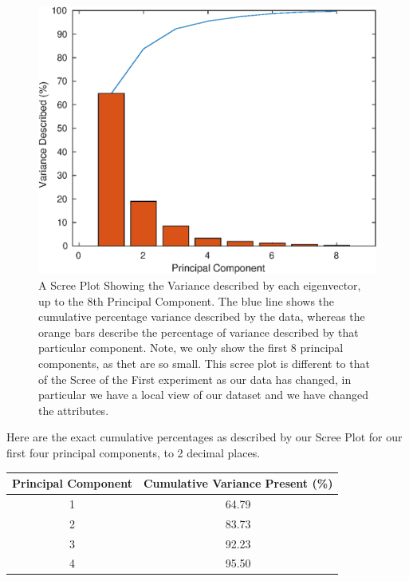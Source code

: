 \documentclass{article}
\begin{document}
\begin{figure}[H]
\centering
\caption{A Scree Plot Showing the Variance described by each eigenvector, up to the 8th Principal Component. The blue line shows the cumulative percentage variance described by the data, whereas the orange bars describe the percentage of variance described by that particular component. Note, we only show the first 8 principal components, as thet are so small. This scree plot is different to that of the Scree of the First experiment as our data has changed, in particular we have a local view of our dataset and we have changed the attributes.}
\includegraphics[scale = 0.75]{local/scree_plot_supply.eps}
\end{figure}

Here are the exact cumulative percentages as described by our Scree Plot for our first four principal components, to 2 decimal places.

\begin{center}
\begin{tabular}{ |c|c| } 
\hline
Principal Component & Cumulative Variance Present (\%) \\
\hline
1 & 64.79 \\ 
2 & 83.73 \\ 
3 & 92.23 \\ 
4 & 95.50 \\
\hline
\end{tabular}
\end{center}
\end{document}
